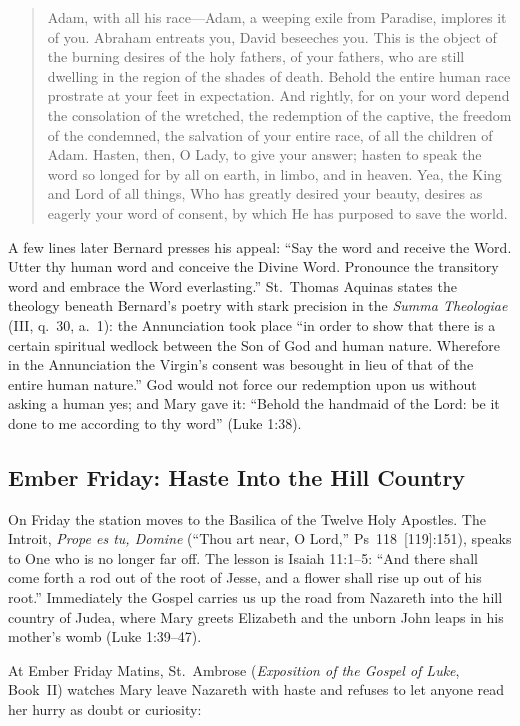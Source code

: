 \begin{quote}
Adam, with all his race---Adam, a weeping exile from Paradise, implores it of
you. Abraham entreats you, David beseeches you. This is the object of the
burning desires of the holy fathers, of your fathers, who are still dwelling in
the region of the shades of death. Behold the entire human race prostrate at
your feet in expectation. And rightly, for on your word depend the consolation
of the wretched, the redemption of the captive, the freedom of the condemned,
the salvation of your entire race, of all the children of Adam. Hasten, then, O
Lady, to give your answer; hasten to speak the word so longed for by all on
earth, in limbo, and in heaven. Yea, the King and Lord of all things, Who has
greatly desired your beauty, desires as eagerly your word of consent, by which
He has purposed to save the world.
\end{quote}

A few lines later Bernard presses his appeal: ``Say the word and receive the
Word. Utter thy human word and conceive the Divine Word. Pronounce the
transitory word and embrace the Word everlasting.'' St.~Thomas Aquinas states
the theology beneath Bernard's poetry with stark precision in the
\textit{Summa Theologiae} (III, q.~30, a.~1): the Annunciation took place ``in
order to show that there is a certain spiritual wedlock between the Son of God
and human nature. Wherefore in the Annunciation the Virgin's consent was
besought in lieu of that of the entire human nature.'' God would not force our
redemption upon us without asking a human yes; and Mary gave it: ``Behold the
handmaid of the Lord: be it done to me according to thy word'' (Luke 1:38).

\subsection{Ember Friday: Haste Into the Hill Country}

On Friday the station moves to the Basilica of the Twelve Holy Apostles. The
Introit, \textit{Prope es tu, Domine} (``Thou art near, O Lord,'' Ps~118~[119]:151),
speaks to One who is no longer far off. The lesson is Isaiah 11:1--5: ``And
there shall come forth a rod out of the root of Jesse, and a flower shall rise
up out of his root.'' Immediately the Gospel carries us up the road from
Nazareth into the hill country of Judea, where Mary greets Elizabeth and the
unborn John leaps in his mother's womb (Luke 1:39--47).

At Ember Friday Matins, St.~Ambrose (\textit{Exposition of the Gospel of Luke},
Book~II) watches Mary leave Nazareth with haste and refuses to let anyone read
her hurry as doubt or curiosity:

